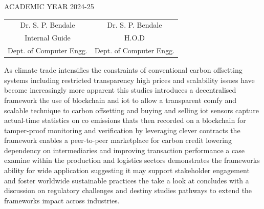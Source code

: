 \documentclass[oneside,a4paper,12pt]{book}
\begin{document}
 \begin{center}
 ACADEMIC YEAR 2024-25
 \end{center}
 
 \vspace*{3\baselineskip}
 \begin{tabular}{c c }
Dr. S. P. Bendale &  \hspace{50 mm} Dr. S. P. Bendale \\								
Internal Guide   &  \hspace{50 mm} H.O.D \\
Dept. of Computer Engg.  &	\hspace{50 mm}Dept. of Computer Engg.  \\
\end{tabular}
\newpage

\setcounter{page}{0}
\frontmatter
{}
\rfoot{\thepage}

		
{   \setlength{\parindent}{11mm} }
{ \setlength{\parindent}{0mm} }
As climate trade intensifies the constraints of conventional carbon offsetting systems including restricted transparency high prices and scalability issues have become increasingly more apparent this studies introduces a decentralised framework the use of blockchain and iot to allow a transparent comfy and scalable technique to carbon offsetting and buying and selling iot sensors capture actual-time statistics on co emissions thats then recorded on a blockchain for tamper-proof monitoring and verification by leveraging clever contracts the framework enables a peer-to-peer marketplace for carbon credit lowering dependency on intermediaries and improving transaction performance a case examine within the production and logistics sectors demonstrates the frameworks ability for wide application suggesting it may support stakeholder engagement and foster worldwide sustainable practices the take a look at concludes with a discussion on regulatory challenges and destiny studies pathways to extend the
frameworks impact across industries.

{   \setlength{\parindent}{11mm} }
{ \setlength{\parindent}{0mm} }
\end{document}
